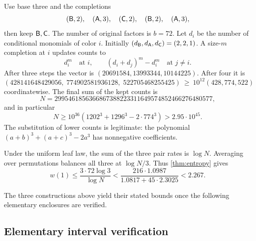 Use base three and the completions
\[
 (\mathsf B,2),\quad(\mathsf A,3),\quad(\mathsf C,2),\quad
 (\mathsf B,2),\quad(\mathsf A,3),
\]
then keep \(\mathsf B,\mathsf C\).
The number of original factors is \(b=72\).
Let \(d_i\) be the number of conditional monomials of color \(i\).
Initially \((d_{\mathsf B},d_{\mathsf A},d_{\mathsf C})=(2,2,1)\).
A size-\(m\) completion at \(i\) updates counts to
\[
 d_i^m\quad\text{at }i,\qquad
 (d_i+d_j)^m-d_i^m\quad\text{at }j\ne i.
\]
After three steps the vector is
\((20691584,13993344,10144225)\).
After four it is
\[
 (428141648429056,\;774902581936128,\;522705468255425)
 \ \ge\ 10^{12}(428,774,522)
\]
coordinatewise.
The final sum of the kept counts is
\[
 N=2995461856366867388223311649574852466276480577,
\]
and in particular
\begin{equation}\label{eq:square-count-lower}
 N\ge 10^{36}
      (1202^3+1296^3-2\cdot774^3)>2.95\cdot10^{45}.
\end{equation}
The substitution of lower counts is legitimate: the polynomial
\((a+b)^3+(a+c)^3-2a^3\) has nonnegative coefficients.

Under the uniform leaf law, the sum of the three pair rates is
\(\log N\).
Averaging over permutations balances all three at \(\log N/3\).
Thus \cref{thm:entropy} gives
\[
 w(1)\le \frac{3\cdot72\log3}{\log N}
 <\frac{216\cdot1.0987}{1.0817+45\cdot2.3025}
 <2.267.
\]

\noindent The three constructions above yield their stated bounds
once the following elementary enclosures are verified.

\subsection{Elementary interval verification}\label{subsec:log-certificate}

